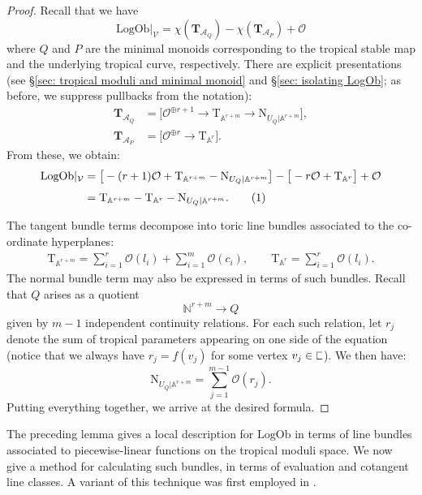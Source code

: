 \documentclass[11pt]{amsart}
\theoremstyle{definition}
\theoremstyle{definition}
\newcommand{\sqC}{\scalebox{0.8}[1.2]{$\sqsubset$}}
\newcommand{\TT}{\mathbf{T}}
\newcommand{\Aaff}{\mathbb{A}}
\newcommand{\T}{\mathrm{T}}
\newcommand{\OO}{\mathcal{O}}
\newcommand{\N}{\mathbb{N}}
\newcommand{\LogOb}{\mathrm{LogOb}}
\newcommand{\Acal}{\mathcal{A}}
\begin{document}
\begin{proof}
Recall that we have
\begin{equation*} \LogOb|_{\mathcal{V}} = \chi(\TT_{\Acal_Q}) - \chi(\TT_{\Acal_P}) + \OO \end{equation*}
where $Q$ and $P$ are the minimal monoids corresponding to the tropical stable map and the underlying tropical curve, respectively. There are explicit presentations (see \S \ref{sec: tropical moduli and minimal monoid} and \S \ref{sec: isolating LogOb}; as before, we suppress pullbacks from the notation):
\begin{align*} \TT_{\Acal_Q} &  = \big[\OO^{\oplus r+1} \to \T_{\Aaff^{r+m}} \to \mathrm{N}_{U_Q|\Aaff^{r+m}} \big], \\[3pt]
\TT_{\Acal_P} & = \big[ \OO^{\oplus r} \to  \T_{\Aaff^r} \big]. \end{align*}
From these, we obtain:
\begin{align*}\LogOb |_{\mathcal{V}} & = \big[ -(r+1)\OO + \mathrm{T}_{\Aaff^{r+m}} - \mathrm{N}_{U_Q|\Aaff^{r+m}} \big] - \big[ - r \OO + \mathrm{T}_{\Aaff^r} \big] + \OO	\\[3pt]
& = \mathrm{T}_{\Aaff^{r+m}} - \mathrm{T}_{\Aaff^r} - \mathrm{N}_{U_Q|\Aaff^{r+m}}.\addtocounter{equation}{1}\tag{\theequation} \label{eqn: LogOb description tangent normal bundles} \end{align*}

The tangent bundle terms decompose into toric line bundles associated to the co-ordinate hyperplanes:
\begin{align*} \T_{\Aaff^{r+m}} = \sum_{i=1}^r \OO(l_i) + \sum_{i=1}^m \OO(c_i), \qquad
\T_{\Aaff^r} = \sum_{i=1}^r \OO(l_i).\end{align*}
The normal bundle term may also be expressed in terms of such bundles. Recall that $Q$ arises as a quotient
\begin{equation*} \N^{r+m} \rightarrow Q \end{equation*}
given by $m-1$ independent continuity relations. For each such relation, let $r_j$ denote the sum of tropical parameters appearing on one side of the equation (notice that we always have $r_j = f(v_j)$ for some vertex $v_j \in \sqC$). We then have:
\begin{equation*} \mathrm{N}_{U_Q|\Aaff^{r+m}} = \sum_{j=1}^{m-1} \OO(r_j).\end{equation*}
Putting everything together, we arrive at the desired formula. 
\end{proof}

The preceding lemma gives a local description for $\LogOb$ in terms of line bundles associated to piecewise-linear functions on the tropical moduli space. We now give a method for calculating such bundles, in terms of evaluation and cotangent line classes. A variant of this technique was first employed in \cite[\S 3]{BNRGenus1}.
\end{document}
